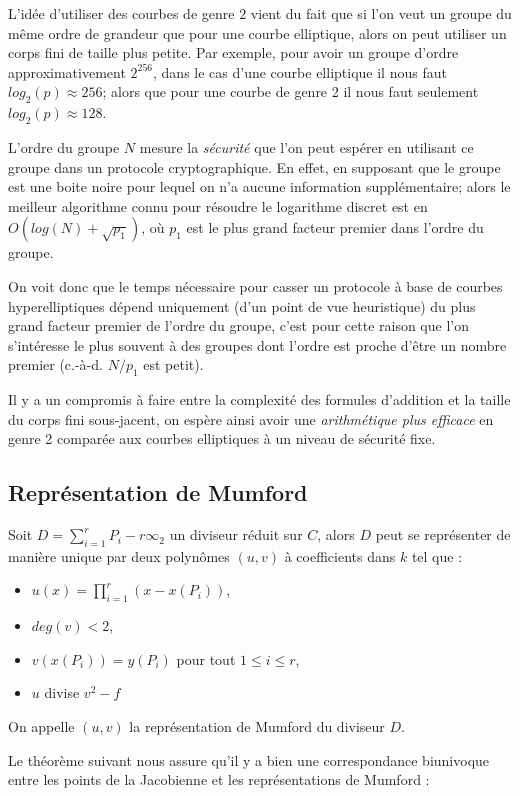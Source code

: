 \documentclass[a4paper,12pt]{article}
\theoremstyle{definition}
\theoremstyle{remark}
\numberwithin{equation}{section}
\begin{document}
L'idée d'utiliser des courbes de genre $2$ vient du fait que si l'on veut un groupe du même ordre de grandeur que pour une courbe elliptique, alors on peut utiliser un corps fini de taille plus petite. Par exemple, pour avoir un groupe d'ordre approximativement $2^{256}$, dans le cas d'une courbe elliptique il nous faut $log_2(p) \approx 256$; alors que pour une courbe de genre 2 il nous faut seulement $log_2(p) \approx 128$.

L'ordre du groupe $N$ mesure la \emph{sécurité} que l'on peut espérer en utilisant ce groupe dans un protocole cryptographique.
En effet, en supposant que le groupe est une boite noire pour lequel on n'a aucune information supplémentaire; alors le meilleur algorithme connu pour résoudre le logarithme discret est en $O(log(N)+\sqrt{p_1})$, où $p_1$ est le plus grand facteur premier dans l'ordre du groupe.

On voit donc que le temps nécessaire pour casser un protocole à base de courbes hyperelliptiques dépend uniquement (d'un point de vue heuristique) du plus grand facteur premier de l'ordre du groupe, c'est pour cette raison que l'on s'intéresse le plus souvent à des groupes dont l'ordre est proche d'être un nombre premier (c.-à-d. $N/p_1$ est petit).

Il y a un compromis à faire entre la complexité des formules d'addition et la taille du corps fini sous-jacent, on espère ainsi avoir une \emph{arithmétique plus efficace} en genre 2 comparée aux courbes elliptiques à un niveau de sécurité fixe.
 
\subsection{Représentation de Mumford}
Soit $D = \sum_{i=1}^r{P_i} - r\infty_2$ un diviseur réduit sur $C$, alors $D$ peut se représenter de manière unique par deux polynômes $(u,v)$ à coefficients dans $k$ tel que :
\begin{itemize}
\item $u(x) =  \prod_{i=1}^r (x - x(P_i) )$,
\item $deg(v) < 2$,
\item $v(x(P_i)) = y(P_i)$ pour tout $1 \leq i \leq r$,
\item $u$ divise $v^2 - f$
\end{itemize}
On appelle $(u,v)$ la représentation de Mumford du diviseur $D$.

Le théorème suivant nous assure qu'il y a bien une correspondance biunivoque entre les points de la Jacobienne et les représentations de Mumford :
\end{document}
